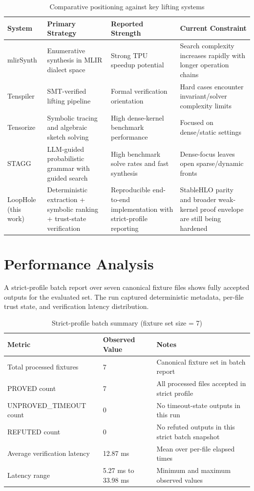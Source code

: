 \begin{table}[H]
\centering
\caption{Comparative positioning against key lifting systems}
\label{tab:comparative}
\begin{tabular}{|p{2.7cm}|p{3.5cm}|p{3.0cm}|p{6.1cm}|}
\hline
\textbf{System} & \textbf{Primary Strategy} & \textbf{Reported Strength} & \textbf{Current Constraint} \\
\hline
mlirSynth \cite{mlirsynth} & Enumerative synthesis in MLIR dialect space & Strong TPU speedup potential & Search complexity increases rapidly with longer operation chains \\
\hline
Tenspiler \cite{tenspiler} & SMT-verified lifting pipeline & Formal verification orientation & Hard cases encounter invariant/solver complexity limits \\
\hline
Tensorize \cite{tensorize} & Symbolic tracing and algebraic sketch solving & High dense-kernel benchmark performance & Focused on dense/static settings \\
\hline
STAGG \cite{stagg} & LLM-guided probabilistic grammar with guided search & High benchmark solve rates and fast synthesis & Dense-focus leaves open sparse/dynamic fronts \\
\hline
LoopHole (this work) & Deterministic extraction + symbolic ranking + trust-state verification & Reproducible end-to-end implementation with strict-profile reporting & StableHLO parity and broader weak-kernel proof envelope are still being hardened \\
\hline
\end{tabular}
\end{table}

\section{Performance Analysis}
A strict-profile batch report over seven canonical fixture files shows fully accepted outputs for the evaluated set. The run captured deterministic metadata, per-file trust state, and verification latency distribution.

\begin{table}[H]
\centering
\caption{Strict-profile batch summary (fixture set size = 7)}
\begin{tabular}{|p{6.0cm}|p{4.0cm}|p{5.0cm}|}
\hline
\textbf{Metric} & \textbf{Observed Value} & \textbf{Notes} \\
\hline
Total processed fixtures & 7 & Canonical fixture set in batch report \\
\hline
PROVED count & 7 & All processed files accepted in strict profile \\
\hline
UNPROVED\_TIMEOUT count & 0 & No timeout-state outputs in this run \\
\hline
REFUTED count & 0 & No refuted outputs in this strict batch snapshot \\
\hline
Average verification latency & 12.87 ms & Mean over per-file elapsed times \\
\hline
Latency range & 5.27 ms to 33.98 ms & Minimum and maximum observed values \\
\hline
\end{tabular}
\end{table}

